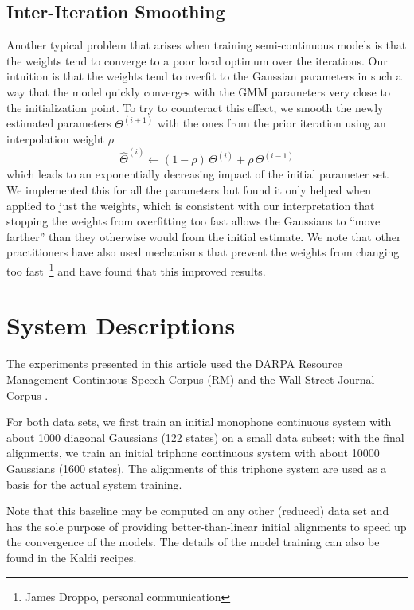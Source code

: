 \documentclass{article}
\begin{document}
\subsection{Inter-Iteration Smoothing}
Another typical problem that arises when training semi-continuous models is
that the weights tend to converge to a poor local optimum over the iterations. 
Our intuition is that the weights tend to overfit to the Gaussian parameters
in such a way that the model quickly converges with the
GMM parameters very close to the initialization point.
%
To try to counteract this effect, we smooth the newly estimated parameters 
$\Theta^{(i+1)}$ with the ones from the prior iteration using an interpolation weight $\rho$
\begin{equation}
\hat\Theta^{(i)} \leftarrow (1 - \rho) \, \Theta^{(i)} + \rho \, \Theta^{(i-1)} %
\end{equation}
which leads to an exponentially decreasing impact of the initial parameter set.
We implemented this for all the parameters but found it only helped when
applied to just the weights,
which is consistent with our interpretation that stopping the weights from overfitting
too fast allows the Gaussians to ``move farther'' than they otherwise would from
the initial estimate.  We note that other practitioners have also used mechanisms that
prevent the weights from changing too fast~\footnote{James Droppo, personal communication} and
have found that this improved results.


\section{System Descriptions}
\label{sec:sys}

The experiments presented in this article used the DARPA Resource 
Management Continuous Speech Corpus (RM) \cite{price1993rm} and the Wall Street
Journal Corpus \cite{garofalo2007wsj}.

For both data sets, we first train an initial monophone continuous system
with about 1000 diagonal Gaussians (122 states) on a small data subset; with 
the final alignments, we train an initial triphone continuous system with 
about 10000 Gaussians (1600 states).  The alignments of this triphone system
are used as a basis for the actual system training.

Note that this baseline may be computed on any other (reduced) data set
and has the sole purpose of providing better-than-linear initial alignments
to speed up the convergence of the models.
%
The details of the model training can also be found in the {\sc Kaldi} recipes.
\end{document}
